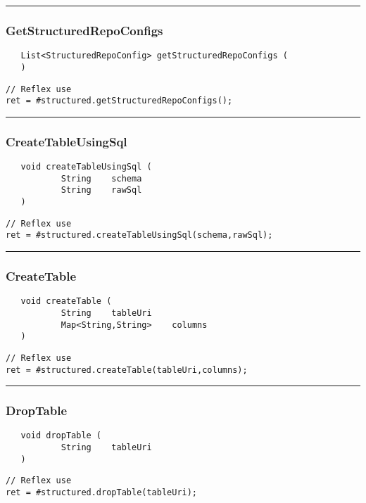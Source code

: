 \rule{15cm}{2pt}
\subsubsection{GetStructuredRepoConfigs}
\label{Api:GetStructuredRepoConfigs}
\begin{verbatim}
   List<StructuredRepoConfig> getStructuredRepoConfigs (
   )
\end{verbatim}
\begin{lstlisting}[language=reflex]
// Reflex use
ret = #structured.getStructuredRepoConfigs();
\end{lstlisting}



\rule{15cm}{2pt}
\subsubsection{CreateTableUsingSql}
\label{Api:CreateTableUsingSql}
\begin{verbatim}
   void createTableUsingSql (
           String    schema
           String    rawSql
   )
\end{verbatim}
\begin{lstlisting}[language=reflex]
// Reflex use
ret = #structured.createTableUsingSql(schema,rawSql);
\end{lstlisting}



\rule{15cm}{2pt}
\subsubsection{CreateTable}
\label{Api:CreateTable}
\begin{verbatim}
   void createTable (
           String    tableUri
           Map<String,String>    columns
   )
\end{verbatim}
\begin{lstlisting}[language=reflex]
// Reflex use
ret = #structured.createTable(tableUri,columns);
\end{lstlisting}



\rule{15cm}{2pt}
\subsubsection{DropTable}
\label{Api:DropTable}
\begin{verbatim}
   void dropTable (
           String    tableUri
   )
\end{verbatim}
\begin{lstlisting}[language=reflex]
// Reflex use
ret = #structured.dropTable(tableUri);
\end{lstlisting}



